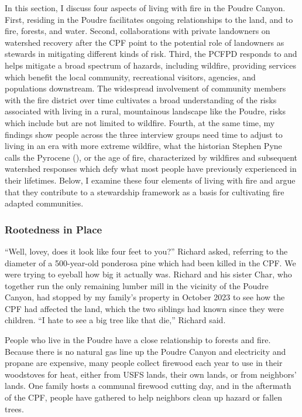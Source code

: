 \documentclass[
]{article}
\begin{document}
In this section, I discuss four aspects of living with fire in the Poudre Canyon. First, residing in the Poudre facilitates ongoing relationships to the land, and to fire, forests, and water. Second, collaborations with private landowners on watershed recovery after the CPF point to the potential role of landowners as stewards in mitigating different kinds of risk. Third, the PCFPD responds to and helps mitigate a broad spectrum of hazards, including wildfire, providing services which benefit the local community, recreational visitors, agencies, and populations downstream. The widespread involvement of community members with the fire district over time cultivates a broad understanding of the risks associated with living in a rural, mountainous landscape like the Poudre, risks which include but are not limited to wildfire. Fourth, at the same time, my findings show people across the three interview groups need time to adjust to living in an era with more extreme wildfire, what the historian Stephen Pyne calls the Pyrocene (), or the age of fire, characterized by wildfires and subsequent watershed responses which defy what most people have previously experienced in their lifetimes. Below, I examine these four elements of living with fire and argue that they contribute to a stewardship framework as a basis for cultivating fire adapted communities.

\subsubsection{Rootedness in Place}\label{rootedness-in-place}

``Well, lovey, does it look like four feet to you?'' Richard asked, referring to the diameter of a 500-year-old ponderosa pine which had been killed in the CPF. We were trying to eyeball how big it actually was. Richard and his sister Char, who together run the only remaining lumber mill in the vicinity of the Poudre Canyon, had stopped by my family's property in October 2023 to see how the CPF had affected the land, which the two siblings had known since they were children. ``I hate to see a big tree like that die,'' Richard said.

People who live in the Poudre have a close relationship to forests and fire. Because there is no natural gas line up the Poudre Canyon and electricity and propane are expensive, many people collect firewood each year to use in their woodstoves for heat, either from USFS lands, their own lands, or from neighbors' lands. One family hosts a communal firewood cutting day, and in the aftermath of the CPF, people have gathered to help neighbors clean up hazard or fallen trees.
\end{document}
